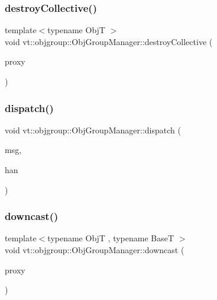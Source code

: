 \subsubsection{\texorpdfstring{destroy\+Collective()}{destroyCollective()}}
{\footnotesize\ttfamily template$<$typename ObjT $>$ \\
void vt\+::objgroup\+::\+Obj\+Group\+Manager\+::destroy\+Collective (\begin{DoxyParamCaption}\item[{\hyperlink{structvt_1_1objgroup_1_1_obj_group_manager_aea65eef52f240a52210132eef5ce591f}{Proxy\+Type}$<$ ObjT $>$}]{proxy }\end{DoxyParamCaption})}

\mbox{\label{structvt_1_1objgroup_1_1_obj_group_manager_a65dffa67cfc975ca32a57c60677b2ae0}} 
\subsubsection{\texorpdfstring{dispatch()}{dispatch()}}
{\footnotesize\ttfamily void vt\+::objgroup\+::\+Obj\+Group\+Manager\+::dispatch (\begin{DoxyParamCaption}\item[{\hyperlink{namespacevt_a54674b9f819f4f3a652c6f78d9b62aaf}{Msg\+Virtual\+Ptr\+Any}}]{msg,  }\item[{\hyperlink{namespacevt_af64846b57dfcaf104da3ef6967917573}{Handler\+Type}}]{han }\end{DoxyParamCaption})}

\mbox{\label{structvt_1_1objgroup_1_1_obj_group_manager_ab7ea99ad2668a99debd687a20bb9e3dd}} 
\subsubsection{\texorpdfstring{downcast()}{downcast()}}
{\footnotesize\ttfamily template$<$typename ObjT , typename BaseT $>$ \\
void vt\+::objgroup\+::\+Obj\+Group\+Manager\+::downcast (\begin{DoxyParamCaption}\item[{\hyperlink{structvt_1_1objgroup_1_1_obj_group_manager_aea65eef52f240a52210132eef5ce591f}{Proxy\+Type}$<$ ObjT $>$}]{proxy }\end{DoxyParamCaption})}

